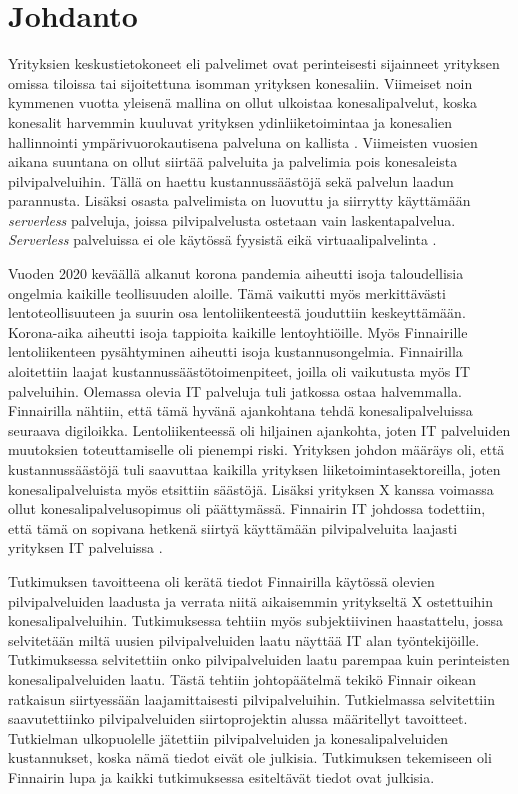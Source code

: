 \chapter{Johdanto\label{johdanto}}
Yrityksien keskustietokoneet eli palvelimet ovat perinteisesti sijainneet yrityksen omissa tiloissa tai sijoitettuna isomman yrityksen konesaliin. Viimeiset noin kymmenen vuotta yleisenä mallina on ollut ulkoistaa konesalipalvelut, koska konesalit harvemmin kuuluvat yrityksen ydinliiketoimintaa ja konesalien hallinnointi ympärivuorokautisena palveluna on kallista \citep{data_center_outsourcing}. Viimeisten vuosien aikana suuntana on ollut siirtää palveluita ja palvelimia pois konesaleista pilvipalveluihin. Tällä on haettu kustannussäästöjä sekä palvelun laadun parannusta. Lisäksi osasta palvelimista on luovuttu ja siirrytty käyttämään \emph{serverless} palveluja, joissa pilvipalvelusta ostetaan vain laskentapalvelua. \emph{Serverless} palveluissa ei ole käytössä fyysistä eikä virtuaalipalvelinta \citep{serverless_computing}.

Vuoden 2020 keväällä alkanut korona pandemia aiheutti isoja taloudellisia ongelmia kaikille teollisuuden aloille. Tämä vaikutti myös merkittävästi lentoteollisuuteen ja suurin osa lentoliikenteestä jouduttiin keskeyttämään. Korona-aika aiheutti isoja tappioita kaikille lentoyhtiöille. Myös Finnairille lentoliikenteen pysähtyminen aiheutti isoja kustannusongelmia. Finnairilla aloitettiin laajat kustannussäästötoimenpiteet, joilla oli vaikutusta myös IT palveluihin. Olemassa olevia IT palveluja tuli jatkossa ostaa halvemmalla. Finnairilla nähtiin, että tämä hyvänä ajankohtana tehdä konesalipalveluissa seuraava digiloikka. Lentoliikenteessä oli hiljainen ajankohta, joten IT palveluiden muutoksien toteuttamiselle oli pienempi riski. Yrityksen johdon määräys oli, että kustannussäästöjä tuli saavuttaa kaikilla yrityksen liiketoimintasektoreilla, joten konesalipalveluista myös etsittiin säästöjä. Lisäksi yrityksen X kanssa voimassa ollut konesalipalvelusopimus oli päättymässä. Finnairin IT johdossa todettiin, että tämä on sopivana hetkenä siirtyä käyttämään pilvipalveluita laajasti yrityksen IT palveluissa \citep{finnair_use_ibm}.

Tutkimuksen tavoitteena oli kerätä tiedot Finnairilla käytössä olevien pilvipalveluiden laadusta ja verrata niitä aikaisemmin yritykseltä X ostettuihin konesalipalveluihin. Tutkimuksessa tehtiin myös subjektiivinen haastattelu, jossa selvitetään miltä uusien pilvipalveluiden laatu näyttää IT alan työntekijöille. Tutkimuksessa selvitettiin onko pilvipalveluiden laatu parempaa kuin perinteisten konesalipalveluiden laatu. Tästä tehtiin johtopäätelmä tekikö Finnair oikean ratkaisun siirtyessään laajamittaisesti pilvipalveluihin. Tutkielmassa selvitettiin saavutettiinko pilvipalveluiden siirtoprojektin alussa määritellyt tavoitteet. Tutkielman ulkopuolelle jätettiin pilvipalveluiden ja konesalipalveluiden kustannukset, koska nämä tiedot eivät ole julkisia. Tutkimuksen tekemiseen oli Finnairin lupa ja kaikki tutkimuksessa esiteltävät tiedot ovat julkisia.

